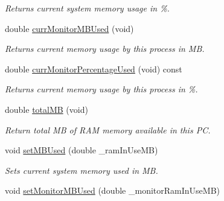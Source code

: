 \begin{DoxyCompactItemize}
\begin{DoxyCompactList}\small\item\em Returns current system memory usage in \%. \end{DoxyCompactList}\item 
double \hyperlink{classRamState_a466ea42215a7837a41cc9a6dbf7e678e}{curr\+Monitor\+M\+B\+Used} (void)\hypertarget{classRamState_a466ea42215a7837a41cc9a6dbf7e678e}{}\label{classRamState_a466ea42215a7837a41cc9a6dbf7e678e}

\begin{DoxyCompactList}\small\item\em Returns current memory usage by this process in MB. \end{DoxyCompactList}\item 
double \hyperlink{classRamState_a8086528973382c478429b79710b0c380}{curr\+Monitor\+Percentage\+Used} (void) const \hypertarget{classRamState_a8086528973382c478429b79710b0c380}{}\label{classRamState_a8086528973382c478429b79710b0c380}

\begin{DoxyCompactList}\small\item\em Returns current memory usage by this process in \%. \end{DoxyCompactList}\item 
double \hyperlink{classRamState_ac8433fa656cf67da00dfdc48b6587fba}{total\+MB} (void)\hypertarget{classRamState_ac8433fa656cf67da00dfdc48b6587fba}{}\label{classRamState_ac8433fa656cf67da00dfdc48b6587fba}

\begin{DoxyCompactList}\small\item\em Return total MB of R\+AM memory available in this PC. \end{DoxyCompactList}\item 
void \hyperlink{classRamState_abb016ce060940f92f342073088f65bc9}{set\+M\+B\+Used} (double \+\_\+ram\+In\+Use\+MB)\hypertarget{classRamState_abb016ce060940f92f342073088f65bc9}{}\label{classRamState_abb016ce060940f92f342073088f65bc9}

\begin{DoxyCompactList}\small\item\em Sets current system memory used in MB. \end{DoxyCompactList}\item 
void \hyperlink{classRamState_aaaa615fa4dd8bd8c0d6cb56344c9d8fd}{set\+Monitor\+M\+B\+Used} (double \+\_\+monitor\+Ram\+In\+Use\+MB)\hypertarget{classRamState_aaaa615fa4dd8bd8c0d6cb56344c9d8fd}{}\label{classRamState_aaaa615fa4dd8bd8c0d6cb56344c9d8fd}


\end{DoxyCompactItemize}
